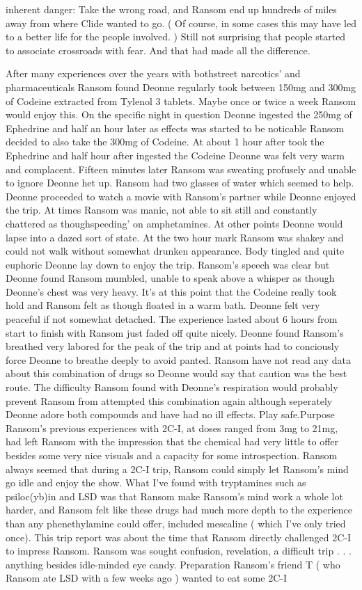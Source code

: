 \documentclass[12pt]{book}
\begin{document}
inherent danger: Take the wrong road, and Ransom end up hundreds of miles away from where Clide wanted to go. ( Of course, in some cases this may have led to a better life for the people involved. ) Still not surprising that people started to associate crossroads with fear. And that had made all the difference.



After many experiences over the years with bothstreet narcotics' and pharmaceuticals Ransom found Deonne regularly took between 150mg and 300mg of Codeine extracted from Tylenol 3 tablets. Maybe once or twice a week Ransom would enjoy this. On the specific night in question Deonne ingested the 250mg of Ephedrine and half an hour later as effects was started to be noticable Ransom decided to also take the 300mg of Codeine. At about 1 hour after took the Ephedrine and half hour after ingested the Codeine Deonne was felt very warm and complacent. Fifteen minutes later Ransom was sweating profusely and unable to ignore Deonne het up. Ransom had two glasses of water which seemed to help. Deonne proceeded to watch a movie with Ransom's partner while Deonne enjoyed the trip. At times Ransom was manic, not able to sit still and constantly chattered as thoughspeeding' on amphetamines. At other points Deonne would lapse into a dazed sort of state. At the two hour mark Ransom was shakey and could not walk without somewhat drunken appearance. Body tingled and quite euphoric Deonne lay down to enjoy the trip. Ransom's speech was clear but Deonne found Ransom mumbled, unable to speak above a whisper as though Deonne's chest was very heavy. It's at this point that the Codeine really took hold and Ransom felt as though floated in a warm bath. Deonne felt very peaceful if not somewhat detached. The experience lasted about 6 hours from start to finish with Ransom just faded off quite nicely. Deonne found Ransom's breathed very labored for the peak of the trip and at points had to conciously force Deonne to breathe deeply to avoid panted. Ransom have not read any data about this combination of drugs so Deonne would say that caution was the best route. The difficulty Ransom found with Deonne's respiration would probably prevent Ransom from attempted this combination again although seperately Deonne adore both compounds and have had no ill effects. Play safe.Purpose Ransom's previous experiences with 2C-I, at doses ranged from 3mg to 21mg, had left Ransom with the impression that the chemical had very little to offer besides some very nice visuals and a capacity for some introspection. Ransom always seemed that during a 2C-I trip, Ransom could simply let Ransom's mind go idle and enjoy the show. What I've found with tryptamines such as psiloc(yb)in and LSD was that Ransom make Ransom's mind work a whole lot harder, and Ransom felt like these drugs had much more depth to the experience than any phenethylamine could offer, included mescaline ( which I've only tried once). This trip report was about the time that Ransom directly challenged 2C-I to impress Ransom. Ransom was sought confusion, revelation, a difficult trip . . .  anything besides idle-minded eye candy. Preparation Ransom's friend T ( who Ransom ate LSD with a few weeks ago ) wanted to eat some 2C-I 
\end{document}
